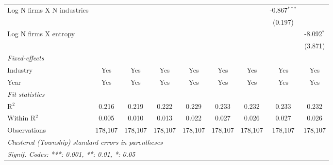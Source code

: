 \begin{tabular}{lcccccccc}
   Log N firms X N industries                            &                  &                 &                  &                  &                  &                  & -0.867$^{***}$   &   \\   
                                                         &                  &                 &                  &                  &                  &                  & (0.197)          &   \\   
   Log N firms X entropy                                 &                  &                 &                  &                  &                  &                  &                  & -8.092$^{*}$\\   
                                                         &                  &                 &                  &                  &                  &                  &                  & (3.871)\\   
   \midrule
   \emph{Fixed-effects}\\
   Industry                                              & Yes              & Yes             & Yes              & Yes              & Yes              & Yes              & Yes              & Yes\\  
   Year                                                  & Yes              & Yes             & Yes              & Yes              & Yes              & Yes              & Yes              & Yes\\  
   \midrule
   \emph{Fit statistics}\\
   R$^2$                                                 & 0.216            & 0.219           & 0.222            & 0.229            & 0.233            & 0.232            & 0.233            & 0.232\\  
   Within R$^2$                                          & 0.005            & 0.010           & 0.013            & 0.022            & 0.027            & 0.026            & 0.027            & 0.026\\  
   Observations                                          & 178,107          & 178,107         & 178,107          & 178,107          & 178,107          & 178,107          & 178,107          & 178,107\\  
   \midrule \midrule
   \multicolumn{9}{l}{\emph{Clustered (Township) standard-errors in parentheses}}\\
   \multicolumn{9}{l}{\emph{Signif. Codes: ***: 0.001, **: 0.01, *: 0.05}}\\
\end{tabular}
\par\endgroup
